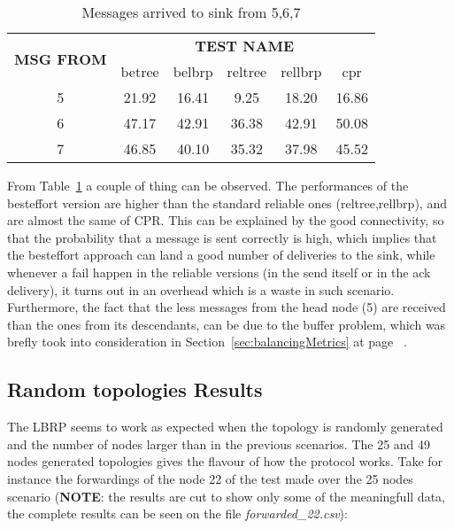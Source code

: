 \documentclass{article}
\begin{document}
		\begin{table}[H]
			\begin{center}
			    \begin{tabular}{|c|c|c|c|c|c|}
				    \hline
				    \multirow{2}{*}{\textbf{MSG FROM}} & \multicolumn{5}{c|}{\textbf{TEST NAME}} \\ \cline{2-6}
					& betree & belbrp & reltree & rellbrp & cpr \\ \hline
					5 & 21.92 & 16.41 & 9.25 & 18.20 & 16.86 \\ \hline
					6 & 47.17 & 42.91 & 36.38 & 42.91 & 50.08 \\ \hline
					7 & 46.85 & 40.10 & 35.32 & 37.98 & 45.52 \\ \hline
			    \end{tabular}
			\end{center}	
			\caption{Messages arrived to sink from 5,6,7}
			\label{tab:stableArrivals}
		\end{table}
From Table~\ref{tab:stableArrivals} a couple of thing can be observed. The performances of the besteffort version are higher than the standard reliable ones (reltree,rellbrp), and are almost the same of CPR. This can be explained by the good connectivity, so that the probability that a message is sent correctly is high, which implies that the besteffort approach can land a good number of deliveries to the sink, while whenever a fail happen in the reliable versions (in the send itself or in the ack delivery), it turns out in an overhead which is a waste in such scenario. Furthermore, the fact that the less messages from the head node (5) are received than the ones from its descendants, can be due to the buffer problem, which was brefly took into consideration in Section~\ref{sec:balancingMetrics} at page ~\pageref{sec:balancingMetrics}.
	\subsection{Random topologies Results}
The LBRP seems to work as expected when the topology is randomly generated and the number of nodes larger than in the previous scenarios. The 25 and 49 nodes generated topologies gives the flavour of how the protocol works. Take for instance the forwardings of the node 22 of the test made over the 25 nodes scenario (\textbf{NOTE}: the results are cut to show only some of the meaningfull data, the complete results can be seen on the file \textit{forwarded\_22.csv}):
		
\end{document}
